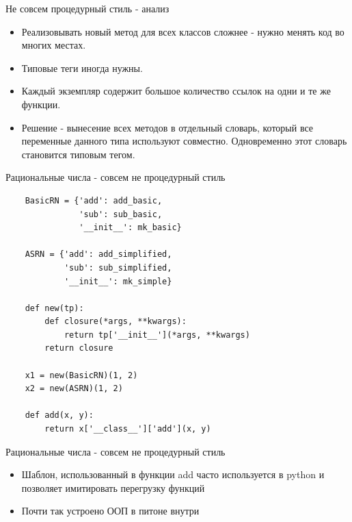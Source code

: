\documentclass{article}
\begin{document}
\begin{center} Не совсем процедурный стиль - анализ \end{center}
\begin{itemize}
    \item Реализовывать новый метод для всех классов сложнее - нужно менять 
          код во многих местах.
    \item Типовые теги иногда нужны.
    \item Каждый экземпляр содержит большое количество ссылок на одни и те же
          функции.
    \item Решение - вынесение всех методов в отдельный словарь, который все 
          переменные данного типа используют совместно. Одновременно этот
          словарь становится типовым тегом.
\end{itemize}
\newpage

\begin{center} Рациональные числа - совсем не процедурный стиль \end{center}
\begin{lstlisting}
    BasicRN = {'add': add_basic, 
               'sub': sub_basic,
               '__init__': mk_basic}

    ASRN = {'add': add_simplified, 
            'sub': sub_simplified,
            '__init__': mk_simple}

    def new(tp):
        def closure(*args, **kwargs):
            return tp['__init__'](*args, **kwargs)
        return closure

    x1 = new(BasicRN)(1, 2)
    x2 = new(ASRN)(1, 2)

    def add(x, y):
        return x['__class__']['add'](x, y)
\end{lstlisting}
\newpage

\begin{center} Рациональные числа - совсем не процедурный стиль \end{center}
\begin{itemize}
    \item Шаблон, использованный в функции add часто используется в 
          python и позволяет имитировать перегрузку функций
    \item Почти так устроено ООП в питоне внутри
\end{itemize}
\newpage
\end{document}
